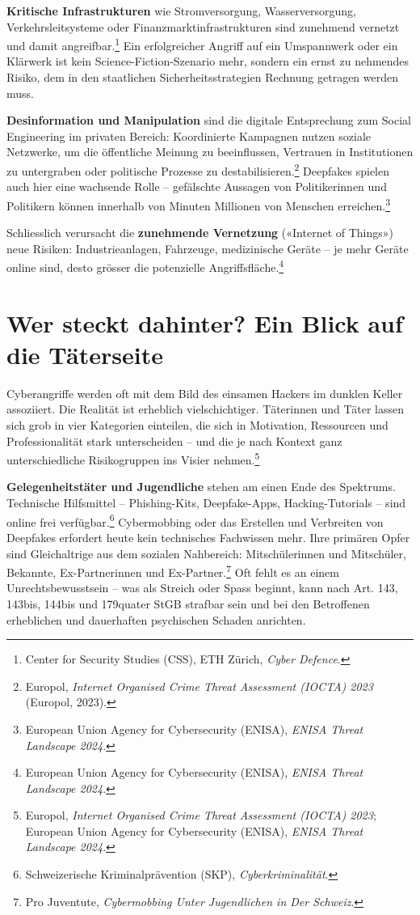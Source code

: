 \documentclass[
  nswissgerman,
  a4paper,
  DIV=11,
  numbers=noendperiod,
  ngerman]{scrreprt}
\begin{document}
\textbf{Kritische Infrastrukturen} wie Stromversorgung,
Wasserversorgung, Verkehrsleitsysteme oder Finanzmarktinfrastrukturen
sind zunehmend vernetzt und damit angreifbar.\footnote{Center for
  Security Studies (CSS), ETH Zürich, \emph{Cyber Defence}.} Ein
erfolgreicher Angriff auf ein Umspannwerk oder ein Klärwerk ist kein
Science-Fiction-Szenario mehr, sondern ein ernst zu nehmendes Risiko,
dem in den staatlichen Sicherheitsstrategien Rechnung getragen werden
muss.

\textbf{Desinformation und Manipulation} sind die digitale Entsprechung
zum Social Engineering im privaten Bereich: Koordinierte Kampagnen
nutzen soziale Netzwerke, um die öffentliche Meinung zu beeinflussen,
Vertrauen in Institutionen zu untergraben oder politische Prozesse zu
destabilisieren.\footnote{Europol, \emph{Internet Organised Crime Threat
  Assessment ({IOCTA}) 2023} (Europol, 2023).} Deepfakes spielen auch
hier eine wachsende Rolle -- gefälschte Aussagen von Politikerinnen und
Politikern können innerhalb von Minuten Millionen von Menschen
erreichen.\footnote{European Union Agency for Cybersecurity (ENISA),
  \emph{{ENISA} Threat Landscape 2024}.}

Schliesslich verursacht die \textbf{zunehmende Vernetzung} («Internet of
Things») neue Risiken: Industrieanlagen, Fahrzeuge, medizinische Geräte
-- je mehr Geräte online sind, desto grösser die potenzielle
Angriffsfläche.\footnote{European Union Agency for Cybersecurity
  (ENISA), \emph{{ENISA} Threat Landscape 2024}.}

\section{Wer steckt dahinter? Ein Blick auf die
Täterseite}\label{wer-steckt-dahinter-ein-blick-auf-die-tuxe4terseite}

Cyberangriffe werden oft mit dem Bild des einsamen Hackers im dunklen
Keller assoziiert. Die Realität ist erheblich vielschichtiger.
Täterinnen und Täter lassen sich grob in vier Kategorien einteilen, die
sich in Motivation, Ressourcen und Professionalität stark unterscheiden
-- und die je nach Kontext ganz unterschiedliche Risikogruppen ins
Visier nehmen.\footnote{Europol, \emph{Internet Organised Crime Threat
  Assessment ({IOCTA}) 2023}; European Union Agency for Cybersecurity
  (ENISA), \emph{{ENISA} Threat Landscape 2024}.}

\textbf{Gelegenheitstäter und Jugendliche} stehen am einen Ende des
Spektrums. Technische Hilfsmittel -- Phishing-Kits, Deepfake-Apps,
Hacking-Tutorials -- sind online frei verfügbar.\footnote{Schweizerische
  Kriminalprävention (SKP), \emph{Cyberkriminalität}.} Cybermobbing oder
das Erstellen und Verbreiten von Deepfakes erfordert heute kein
technisches Fachwissen mehr. Ihre primären Opfer sind Gleichaltrige aus
dem sozialen Nahbereich: Mitschülerinnen und Mitschüler, Bekannte,
Ex-Partnerinnen und Ex-Partner.\footnote{Pro Juventute,
  \emph{Cybermobbing Unter Jugendlichen in Der Schweiz}.} Oft fehlt es
an einem Unrechtsbewusstsein -- was als Streich oder Spass beginnt, kann
nach Art. 143, 143bis, 144bis und 179quater StGB strafbar sein und bei
den Betroffenen erheblichen und dauerhaften psychischen Schaden
anrichten.
\end{document}
